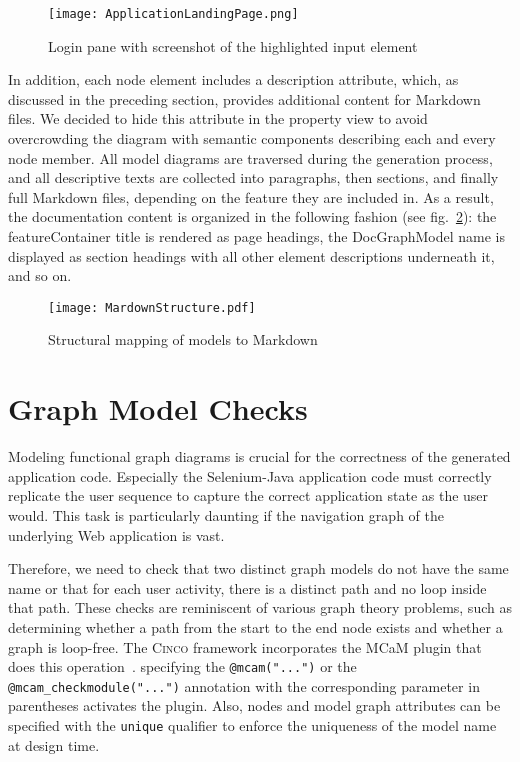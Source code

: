 \begin{figure}[h]
    \centering
    \texttt{[image: ApplicationLandingPage.png]}
    \caption{Login pane with screenshot of the highlighted input element}
    \label{fig:screenshot}
\end{figure}

In addition, each node element includes a description attribute, which, as discussed in the preceding section, provides additional content for Markdown files. We decided to hide this attribute in the property view to avoid overcrowding the diagram with semantic components describing each and every node member. All model diagrams are traversed during the generation process, and all descriptive texts are collected into paragraphs, then sections, and finally full Markdown files, depending on the feature they are included in. As a result, the documentation content is organized in the following fashion (see fig.~\ref{fig:markdown}): the featureContainer title is rendered as page headings, the DocGraphModel name is displayed as section headings with all other element descriptions underneath it, and so on.

\begin{figure}[h]
    \centering
    \texttt{[image: MardownStructure.pdf]}
    \caption{Structural mapping of models to Markdown}
    \label{fig:markdown}
\end{figure}

\section{Graph Model Checks}\label{sec:modCheck}

Modeling functional graph diagrams is crucial for the correctness of the generated application code. Especially the Selenium-Java application code must correctly replicate the user sequence to capture the correct application state as the user would. This task is particularly daunting if the navigation graph of the underlying Web application is vast.

Therefore, we need to check that two distinct graph models do not have the same name or that for each user activity, there is a distinct path and no loop inside that path.  These checks are reminiscent of various graph theory problems, such as determining whether a path from the start to the end node exists and whether a graph is loop-free. The \textsc{Cinco} framework incorporates the MCaM plugin that does this operation~\cite{gitlabcinco}. specifying the \lstinline{@mcam("...")} or the \lstinline{@mcam_checkmodule("...")} annotation with the corresponding parameter in parentheses activates the plugin. Also, nodes and model graph attributes can be specified with the \lstinline[language=MGL]{unique} qualifier to enforce the uniqueness of the model name at design time.

